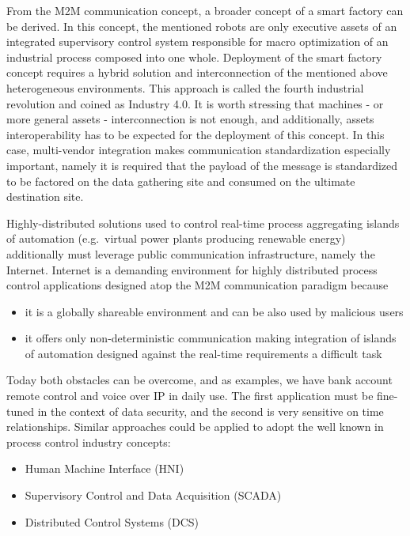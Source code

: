 \documentclass{jacsart}
\begin{document}
From the M2M communication concept, a broader concept of a smart factory can be derived. In this concept, the mentioned robots are only executive assets of an integrated supervisory control system responsible for macro optimization of an industrial process composed into one whole. Deployment of the smart factory concept requires a hybrid solution and interconnection of the mentioned above heterogeneous environments. This approach is called the fourth industrial revolution and coined as Industry 4.0. It is worth stressing that machines - or more general assets - interconnection is not enough, and additionally, assets interoperability has to be expected for the deployment of this concept. In this case, multi-vendor integration makes communication standardization especially important, namely it is required that the payload of the message is standardized to be factored on the data  gathering site and consumed on the ultimate destination site.

Highly-distributed solutions used to control real-time process aggregating islands of automation (e.g.~virtual power plants producing renewable energy) additionally must leverage public communication infrastructure, namely the Internet. Internet is a demanding environment for highly distributed process control applications designed atop the M2M communication paradigm because
\begin{itemize}
      \item it is a globally shareable environment and can be also used by malicious users
      \item it offers only non-deterministic communication making integration of islands of automation designed against the real-time requirements a difficult task
\end{itemize}

Today both obstacles can be overcome, and as examples, we have bank account remote control and voice over IP in daily use. The first application must be fine-tuned in the context of data security, and the second is very sensitive on time relationships. Similar approaches could be applied to adopt the well known in process control industry concepts:

\begin{itemize}
      \item  Human Machine Interface (HNI)
      \item Supervisory Control and Data Acquisition (SCADA)
      \item Distributed Control Systems (DCS)
\end{itemize}
\end{document}
